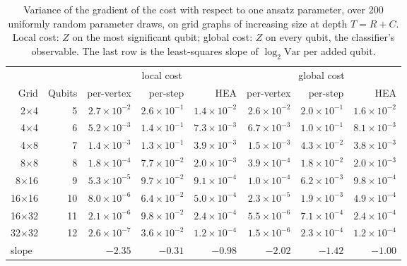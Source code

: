 \begin{table}[htbp]
\centering\small
\caption[Gradient variance of the walk ansatz against register width]{Variance of the gradient of the cost with respect to one ansatz parameter, over 200 uniformly random parameter draws, on grid graphs of increasing size at depth $T = R + C$. Local cost: $Z$ on the most significant qubit; global cost: $Z$ on every qubit, the classifier's observable. The last row is the least-squares slope of $\log_2 \mathrm{Var}$ per added qubit.}
\label{tab:gradvar}
\setlength{\tabcolsep}{4pt}
\begin{tabular}{rrrrrrrr}
\hline
 & & \multicolumn{3}{c}{local cost} & \multicolumn{3}{c}{global cost} \\
Grid & Qubits & per-vertex & per-step & HEA & per-vertex & per-step & HEA \\
\hline
2$\times$4 & 5 & $2.7\times10^{-2}$ & $2.6\times10^{-1}$ & $1.4\times10^{-2}$ & $2.6\times10^{-2}$ & $2.0\times10^{-1}$ & $1.6\times10^{-2}$ \\
4$\times$4 & 6 & $5.2\times10^{-3}$ & $1.4\times10^{-1}$ & $7.3\times10^{-3}$ & $6.7\times10^{-3}$ & $1.0\times10^{-1}$ & $8.1\times10^{-3}$ \\
4$\times$8 & 7 & $1.4\times10^{-3}$ & $1.3\times10^{-1}$ & $3.9\times10^{-3}$ & $1.5\times10^{-3}$ & $4.3\times10^{-2}$ & $3.8\times10^{-3}$ \\
8$\times$8 & 8 & $1.8\times10^{-4}$ & $7.7\times10^{-2}$ & $2.0\times10^{-3}$ & $3.9\times10^{-4}$ & $1.8\times10^{-2}$ & $2.0\times10^{-3}$ \\
8$\times$16 & 9 & $5.3\times10^{-5}$ & $9.7\times10^{-2}$ & $9.1\times10^{-4}$ & $1.0\times10^{-4}$ & $6.2\times10^{-3}$ & $9.8\times10^{-4}$ \\
16$\times$16 & 10 & $8.0\times10^{-6}$ & $6.4\times10^{-2}$ & $5.0\times10^{-4}$ & $2.3\times10^{-5}$ & $1.9\times10^{-3}$ & $4.9\times10^{-4}$ \\
16$\times$32 & 11 & $2.1\times10^{-6}$ & $9.8\times10^{-2}$ & $2.4\times10^{-4}$ & $5.5\times10^{-6}$ & $7.1\times10^{-4}$ & $2.4\times10^{-4}$ \\
32$\times$32 & 12 & $2.6\times10^{-7}$ & $3.6\times10^{-2}$ & $1.2\times10^{-4}$ & $1.5\times10^{-6}$ & $2.3\times10^{-4}$ & $1.2\times10^{-4}$ \\
\hline
\multicolumn{2}{l}{slope} & $-2.35$ & $-0.31$ & $-0.98$ & $-2.02$ & $-1.42$ & $-1.00$ \\
\hline
\end{tabular}
\end{table}

